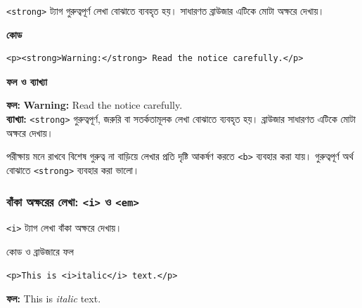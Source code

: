\texttt{<strong>} ট্যাগ গুরুত্বপূর্ণ লেখা বোঝাতে ব্যবহৃত হয়। সাধারণত ব্রাউজার এটিকে মোটা অক্ষরে দেখায়।

\par\noindent
\begin{minipage}[t]{.54\linewidth}\vspace{0pt}\small
\textbf{\color{chFourTeal}কোড}\par
\begin{verbatim}
<p><strong>Warning:</strong> Read the notice carefully.</p>
\end{verbatim}

\par\smallskip
\end{minipage}\hfill
\begin{minipage}[t]{.42\linewidth}\vspace{0pt}\small
\textbf{\color{chFourTeal}ফল ও ব্যাখ্যা}\par
\textbf{ফল:} \textbf{Warning:} Read the notice carefully.\\
\textbf{ব্যাখ্যা:} \texttt{<strong>} গুরুত্বপূর্ণ, জরুরি বা সতর্কতামূলক লেখা বোঝাতে ব্যবহৃত হয়। ব্রাউজার সাধারণত এটিকে মোটা অক্ষরে দেখায়।
\par\smallskip
\end{minipage}\par


\begin{keypointbox}{পরীক্ষায় মনে রাখবে}
বিশেষ গুরুত্ব না বাড়িয়ে লেখার প্রতি দৃষ্টি আকর্ষণ করতে \texttt{<b>} ব্যবহার করা যায়। গুরুত্বপূর্ণ অর্থ বোঝাতে \texttt{<strong>} ব্যবহার করা ভালো।
\end{keypointbox}

\subsubsection{বাঁকা অক্ষরের লেখা: \texttt{<i>} ও \texttt{<em>}}

\texttt{<i>} ট্যাগ লেখা বাঁকা অক্ষরে দেখায়।

\begin{chFourWholeExample}{কোড ও ব্রাউজারে ফল}
\noindent
\begin{minipage}[t]{.50\linewidth}\vspace{0pt}

\begin{verbatim}
<p>This is <i>italic</i> text.</p>
\end{verbatim}

\end{minipage}\hfill
\begin{minipage}[t]{.46\linewidth}\vspace{0pt}
\textbf{ফল:} This is \textit{italic} text.\\
\end{minipage}
\end{chFourWholeExample}

